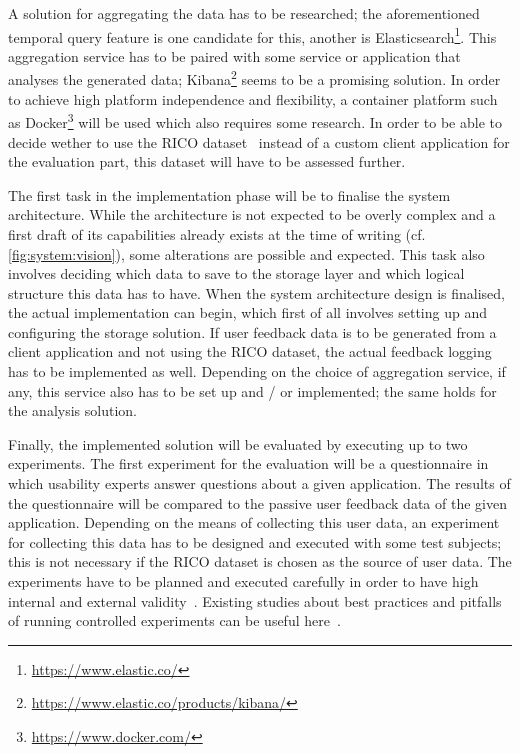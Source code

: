 A solution for aggregating the data has to be researched; the aforementioned temporal query feature is one candidate for this, another is Elasticsearch\footnote{\url{https://www.elastic.co/}}.
This aggregation service has to be paired with some service or application that analyses the generated data; Kibana\footnote{\url{https://www.elastic.co/products/kibana/}} seems to be a promising solution.
In order to achieve high platform independence and flexibility, a container platform such as Docker\footnote{\url{https://www.docker.com/}} will be used which also requires some research.
In order to be able to decide wether to use the RICO dataset~\cite{Deka:2017:Rico} instead of a custom client application for the evaluation part, this dataset will have to be assessed further.

The first task in the implementation phase will be to finalise the system architecture.
While the architecture is not expected to be overly complex and a first draft of its capabilities already exists at the time of writing (cf. \cref{fig:system:vision}), some alterations are possible and expected.
This task also involves deciding which data to save to the storage layer and which logical structure this data has to have.
When the system architecture design is finalised, the actual implementation can begin, which first of all involves setting up and configuring the storage solution.
If user feedback data is to be generated from a client application and not using the RICO dataset, the actual feedback logging has to be implemented as well.
Depending on the choice of aggregation service, if any, this service also has to be set up and / or implemented; the same holds for the analysis solution.

Finally, the implemented solution will be evaluated by executing up to two experiments.
The first experiment for the evaluation will be a questionnaire in which usability experts answer questions about a given application.
The results of the questionnaire will be compared to the passive user feedback data of the given application.
Depending on the means of collecting this user data, an experiment for collecting this data has to be designed and executed with some test subjects; this is not necessary if the RICO dataset is chosen as the source of user data.
The experiments have to be planned and executed carefully in order to have high internal and external validity~\cite{Huitt2010}.
Existing studies about best practices and pitfalls of running controlled experiments can be useful here~\cite{Kohavi2009}.

